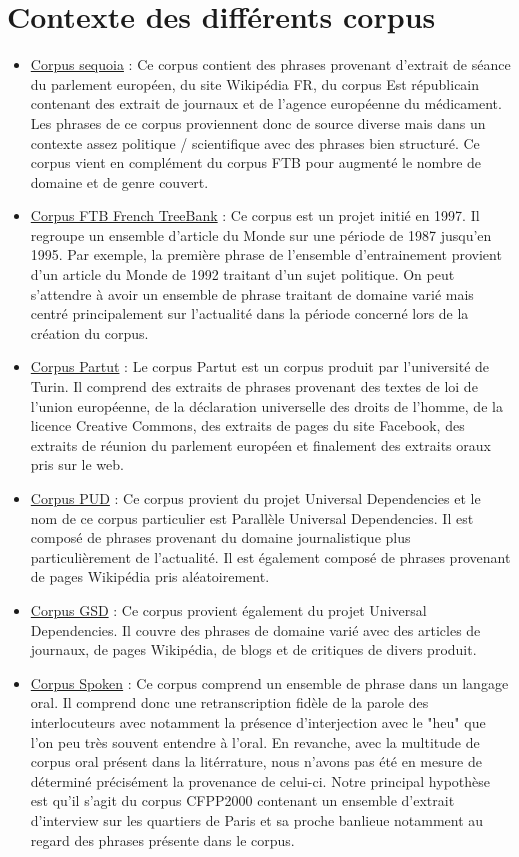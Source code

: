 \documentclass[french, 14pt]{memoir}
\begin{document}
\section{Contexte des différents corpus}
\begin{itemize}
\item \underline{Corpus sequoia} : Ce corpus contient des phrases provenant d'extrait de séance du parlement européen, du site Wikipédia FR, du corpus Est républicain contenant des extrait de journaux et de l'agence européenne du médicament. Les phrases de ce corpus proviennent donc de source diverse mais dans un contexte assez politique / scientifique avec des phrases bien structuré. Ce corpus vient en complément du corpus FTB pour augmenté le nombre de domaine et de genre couvert. 

\item \underline{Corpus FTB French TreeBank} : Ce corpus est un projet initié en 1997. Il regroupe un ensemble d'article du Monde sur une période de 1987 jusqu'en 1995. Par exemple, la première phrase de l'ensemble d'entrainement provient d'un article du Monde de 1992 traitant d'un sujet politique. On peut s'attendre à avoir un ensemble de phrase traitant de domaine varié mais centré principalement sur l'actualité dans la période concerné lors de la création du corpus. 

\item \underline{Corpus Partut} : Le corpus Partut est un corpus produit par l'université de Turin. Il comprend des extraits de phrases provenant des textes de loi de l'union européenne, de la déclaration universelle des droits de l'homme, de la licence Creative Commons, des extraits de pages du site Facebook, des extraits de réunion du parlement européen et finalement des extraits oraux pris sur le web.

\item \underline{Corpus PUD} : Ce corpus provient du projet Universal Dependencies et le nom de ce corpus particulier est Parallèle Universal Dependencies. Il est composé de phrases provenant du domaine journalistique plus particulièrement de l'actualité. Il est également composé de phrases provenant de pages Wikipédia pris aléatoirement.

\item \underline{Corpus GSD} : Ce corpus provient également du projet Universal Dependencies. Il couvre des phrases de domaine varié avec des articles de journaux, de pages Wikipédia, de blogs et de critiques de divers produit.

\item \underline{Corpus Spoken} : Ce corpus comprend un ensemble de phrase dans un langage oral. Il comprend donc une retranscription fidèle de la parole des interlocuteurs avec notamment la présence d'interjection avec le "heu" que l'on peu très souvent entendre à l'oral. En revanche, avec la multitude de corpus oral présent dans la litérrature, nous n'avons pas été en mesure de déterminé précisément la provenance de celui-ci. Notre principal hypothèse est qu'il s'agit du corpus CFPP2000 contenant un ensemble d'extrait d'interview sur les quartiers de Paris et sa proche banlieue notamment au regard des phrases présente dans le corpus. 
\end{itemize}
\end{document}
